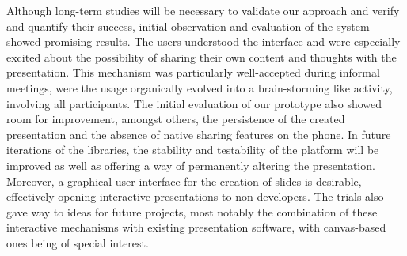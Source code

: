 Although long-term studies will be necessary to validate our approach and verify and quantify their success, initial observation and evaluation of the system showed promising results. The users understood the interface and were especially excited about the possibility of sharing their own content and thoughts with the presentation. This mechanism was particularly well-accepted during informal meetings, were the usage organically evolved into a brain-storming like activity, involving all participants. The initial evaluation of our prototype also showed room for improvement, amongst others, the persistence of the created presentation and the absence of native sharing features on the phone. In future iterations of the libraries, the stability and testability of the platform will be improved as well as offering a way of permanently altering the presentation.
Moreover, a graphical user interface for the creation of slides is desirable, effectively opening interactive presentations to non-developers. The trials also gave way to ideas for future projects, most notably the combination of these interactive mechanisms with existing presentation software, with canvas-based ones being of special interest.